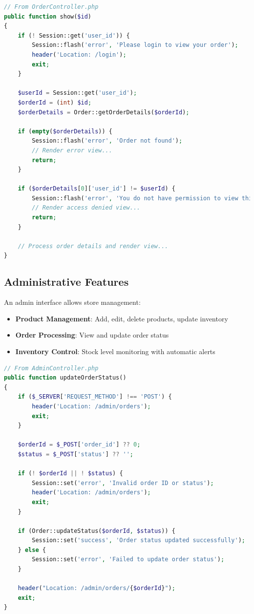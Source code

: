 \documentclass[14pt,a4paper]{article}
\begin{document}
\begin{lstlisting}[language=PHP, caption=Order tracking implementation]
// From OrderController.php
public function show($id)
{
    if (! Session::get('user_id')) {
        Session::flash('error', 'Please login to view your order');
        header('Location: /login');
        exit;
    }

    $userId = Session::get('user_id');
    $orderId = (int) $id;
    $orderDetails = Order::getOrderDetails($orderId);

    if (empty($orderDetails)) {
        Session::flash('error', 'Order not found');
        // Render error view...
        return;
    }

    if ($orderDetails[0]['user_id'] != $userId) {
        Session::flash('error', 'You do not have permission to view this order');
        // Render access denied view...
        return;
    }

    // Process order details and render view...
}
\end{lstlisting}

\subsection{Administrative Features}
An admin interface allows store management:
\begin{itemize}
    \item \textbf{Product Management}: Add, edit, delete products, update inventory
    \item \textbf{Order Processing}: View and update order status
    \item \textbf{Inventory Control}: Stock level monitoring with automatic alerts
\end{itemize}

\begin{lstlisting}[language=PHP, caption=Admin order status update]
// From AdminController.php
public function updateOrderStatus()
{
    if ($_SERVER['REQUEST_METHOD'] !== 'POST') {
        header('Location: /admin/orders');
        exit;
    }

    $orderId = $_POST['order_id'] ?? 0;
    $status = $_POST['status'] ?? '';

    if (! $orderId || ! $status) {
        Session::set('error', 'Invalid order ID or status');
        header('Location: /admin/orders');
        exit;
    }

    if (Order::updateStatus($orderId, $status)) {
        Session::set('success', 'Order status updated successfully');
    } else {
        Session::set('error', 'Failed to update order status');
    }

    header("Location: /admin/orders/{$orderId}");
    exit;
}
\end{lstlisting}
\end{document}

